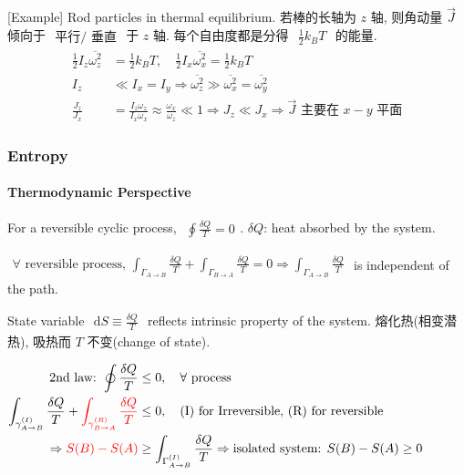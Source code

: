 \documentclass[../../main.tex]{subfiles}
\begin{document}
    [Example] Rod particles in thermal equilibrium. 若棒的长轴为 $z$ 轴, 则角动量 $\vec{J}$ 倾向于 $\begin{aligned}
        \text{平行/ }\boxed{\text{垂直}}
    \end{aligned}$ 于 $z$ 轴. 每个自由度都是分得 $\begin{aligned}
        \frac{1}{2}k_{B}T
    \end{aligned}$ 的能量.
    \begin{align*}
        \frac{1}{2}I_{z}\overline{\omega_{z}^{2}} &= \frac{1}{2}k_{B}T,\quad 
        \frac{1}{2}I_{x}\overline{\omega_{x}^{2}} = \frac{1}{2}k_{B}T\\
        I_{z}&\ll I_{x} = I_{y}  \Rightarrow \overline{\omega_{z}^{2}} \gg \overline{\omega_{x}^{2}} = \overline{\omega_{y}^{2}}\\
        \frac{J_{z}}{J_{x}} &= \frac{I_{z}\omega_{z}}{I_{x}\omega_{x}} \approx \frac{\omega_{x}}{\omega_{z}} \ll 1\Rightarrow J_{z} \ll J_{x}\Rightarrow \vec{J}\text{ 主要在 }x-y\text{ 平面}
    \end{align*}

\subsubsection{Entropy}

\paragraph{Thermodynamic Perspective}
For a reversible cyclic process, $\begin{aligned}
        \oint\frac{\delta Q}{T} = 0
    \end{aligned}$. $\delta Q$: heat absorbed by the system.
    
    $\begin{aligned}
        \forall\text{ reversible process, }\int_{\Gamma_{A\rightarrow B}}\frac{\delta Q}{T} + \int_{\Gamma_{B\rightarrow A}}\frac{\delta Q}{T}  = 0 \Rightarrow \int_{\Gamma_{A\rightarrow B}}\frac{\delta Q}{T}
    \end{aligned}$ is independent of the path. 

    State variable $\begin{aligned}
        \mathrm{d}S\equiv\frac{\delta Q}{T} 
    \end{aligned}$ reflects intrinsic property of the system. 熔化热(相变潜热), 吸热而 $T$ 不变(change of state). 
    
    $\begin{aligned}
        \text{2nd law: }\oint\frac{\delta Q}{T}&\leq 0,\quad \forall\text{ process}\\
        \int_{\gamma_{A\rightarrow B}^{(I)}}\frac{\delta Q}{T} + {\color{red}{\int_{\gamma_{B\rightarrow A}^{(R)}}\frac{\delta Q}{T}}}&\leq 0,\quad \text{(I) for Irreversible, (R) for reversible}\\
        \Rightarrow {\color{red}{S(B) - S(A)}} &\geq \int_{\Gamma_{A\rightarrow B}^{(I)}}\frac{\delta Q}{T}\Rightarrow \text{isolated system: }S(B) - S(A)\geq 0
    \end{aligned}$
\end{document}
